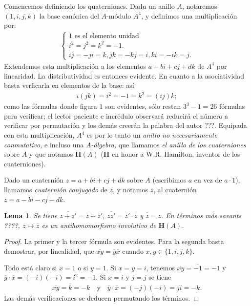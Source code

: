 \documentclass[oneside,bibtotoc,leqno,spanish]{amsbook}
\newcommand{\HH}{\mathbf{H}}
\newcommand{\QED}{}%
\newcommand{\oline}[1]{\overline{#1}}
\numberwithin{equation}{section}
\theoremstyle{defi}
\theoremstyle{note}
\newtheorem{lemma}{Lema}
\theoremstyle{rem}
\numberwithin{theorem}{section}
\numberwithin{proposition}{section}
\numberwithin{definition}{section}
\numberwithin{lemma}{section}
\numberwithin{corollary}{section}
\numberwithin{example}{section}
\numberwithin{footnote}{section}%
\begin{document}
Comencemos definiendo los quaterniones. Dadu un anillo $A$, notaremos $(1,i,j,k)$ la base can\'onica del
$A$-m\'odulo $A^{4}$, y definimos una multiplicaci\'on por:
\begin{gather}\label{eq-5.7-1}
\begin{cases}
\text{$1$ es el elemento unidad}\\
\text{$i^{2}=j^{2}=k^{2}=-1$.}\\
\text{$ij=-ji=k, jk=-kj=i, ki=-ik=j$.}
\end{cases}
\end{gather}
Extendemos esta multiplicaci\'on a los elementos $a+bi+cj+dk$ de $A^{4}$ por linearidad. La distributividad
es entonces evidente. En cuanto a la asociatividad basta verficarla en elementos de la base: as\'i
\begin{gather*}
i(jk) = i^{2} = -1 = k^{2} = (ij)k;
\end{gather*}
como las f\'ormulas donde figura $1$ son evidentes, s\'olo restan $3^{3}-1=26$ f\'ormulas para verificar;
el lector paciente e incr\'edulo observar\'a reducir\'a el n\'umero a verificar por permutaci\'on y los
dem\'as creer\'an la palabra del autor ???. Equipada con esta multiplicaci\'on, $A^{4}$ es por lo tanto
un {\em anillo no necesariamente conmutativo,} e incluso una {\em $A$-\'algebra,} que llamamos
{\em el anillo de los cuaterniones} sobre $A$ y que notamos $\HH(A)$ ($\HH$ en honor a W.R. Hamilton, inventor
de los cuaterniones).

Dado un cuaterni\'on $z = a+bi+cj+dk$ sobre $A$ (escribimos $a$ en vez de $a\cdot 1$), llamamos
{\em cuaterni\'on conjugado} de $z$, y notamos $\oline z$, al cuaterni\'on $\oline z = a-bi-cj-dk$.

\begin{lemma}
Se tiene $\oline{z+z'} = \oline z+\oline z'$, $\oline{zz'} = \oline z'\cdot\oline z$ y
$\oline{\oline z}=z$. En t\'erminos m\'as savants ????, $z\mapsto\oline z$ es un antihomomorfismo involutivo
de $\HH(A)$.
\end{lemma}

\begin{proof}
La primer y la tercer f\'ormula son evidentes. Para la segunda basta demostrar, por linealidad,
que $\oline{xy} = \oline{y}\oline x$ cuando $x,y\in\{1,i,j,k\}$.

Todo est\'a claro si $x=1$ o si $y=1$. Si $x=y=i$, tenemos $\oline{xy} = \oline{-1}=-1$ y
$\oline y\cdot\oline x = (-i)(-i) = i^{2}=-1$. Si $x=i$ y $j=j$ se tiene
\begin{gather*}
\oline{xy} = \oline k = -k\quad\text{y}\quad\oline y\cdot\oline x = (-j)(-i) = ji = -k.
\end{gather*}
Las dem\'as verificaciones se deducen permutando los t\'erminos. \QED
\end{proof}
\end{document}
